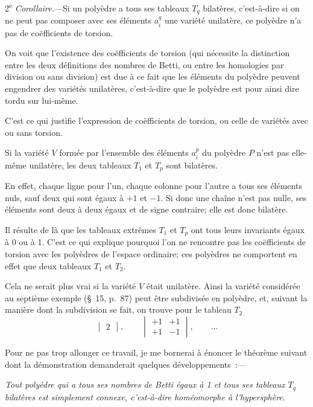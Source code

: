 \documentclass{article}
\begin{document}
2\textsuperscript{e} \emph{Corollaire.}---Si un polyèdre a tous ses tableaux $T_{q}$ bilatères, c'est-à-dire si on ne peut pas composer avec ses éléments $a^{q}_{i}$ une variété unilatère, ce polyèdre n'a pas de coëfficients de torsion.

On voit que l'existence des coëfficients de torsion (qui nécessite la distinction entre les deux définitions des nombres de Betti, ou entre les homologies par division ou sans division) est due à ce fait que les éléments du polyèdre peuvent engendrer des variétés unilatères, c'est-à-dire que le polyèdre est pour ainsi dire tordu sur lui-même.

C'est ce qui justifie l'expression de coëfficients de torsion, ou celle de variétés avec ou sans torsion.

Si la variété $V$ formée par l'ensemble des éléments $a^{p}_{i}$ du polyèdre $P$ n'est pas elle-même unilatère, les deux tableaux $T_{1}$ et $T_{p}$ sont bilatères.

En effet, chaque ligne pour l'un, chaque colonne pour l'autre a tous ses éléments nuls, sauf deux qui sont égaux à $+1$ et $-1$. Si donc une chaîne n'est pas nulle, ses éléments sont deux à deux égaux et de signe contraire; elle est donc bilatère.

Il résulte de là que les tableaux extrêmes $T_{1}$ et $T_{p}$ ont tous leurs invariants égaux à 0 ou à 1. C'est ce qui explique pourquoi l'on ne rencontre pas les coëfficients de torsion avec les polyèdres de l'espace ordinaire; ces polyèdres ne comportent en effet que deux tableaux $T_{1}$ et $T_{2}$.

Cela ne serait plus vrai si la variété $V$ était unilatère. Ainsi la variété considérée au septième exemple (\S~15, p.\ 87) peut être subdivisée en polyèdre, et, suivant la manière dont la subdivision se fait, on trouve pour le tableau $T_{2}$
\[ \begin{vmatrix} 2 \end{vmatrix}, \qquad \begin{vmatrix} +1 & +1 \\[1ex] +1 & -1 \end{vmatrix}, \qquad \ldots \]

Pour ne pas trop allonger ce travail, je me bornerai à énoncer le théorème suivant dont la démonstration demanderait quelques développements~:---

\emph{Tout polyèdre qui a tous ses nombres de Betti égaux à 1 et tous ses tableaux $T_{q}$ bilatères est simplement connexe, c'est-à-dire homéomorphe à l'hypersphère}.
\end{document}
